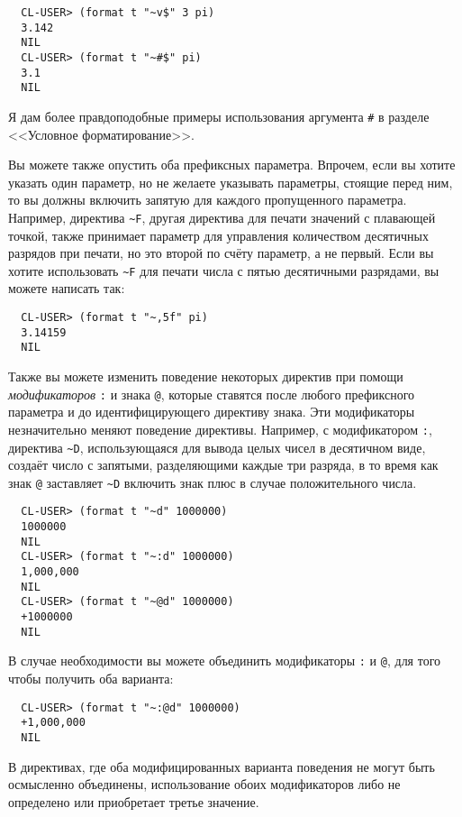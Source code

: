 \begin{verbatim}
  CL-USER> (format t "~v$" 3 pi)
  3.142
  NIL
  CL-USER> (format t "~#$" pi)
  3.1
  NIL
\end{verbatim}

Я дам более правдоподобные примеры использования аргумента \lstinline!#! в
разделе <<Условное форматирование>>.

Вы можете также опустить оба префиксных параметра. Впрочем, если вы хотите указать один
параметр, но не желаете указывать параметры, стоящие перед ним, то вы должны включить
запятую для каждого пропущенного параметра. Например, директива \lstinline!~F!, другая
директива для печати значений с плавающей точкой, также принимает параметр для управления
количеством десятичных разрядов при печати, но это второй по счёту параметр, а не
первый. Если вы хотите использовать \lstinline!~F! для печати числа с пятью десятичными
разрядами, вы можете написать так:

\begin{verbatim}
  CL-USER> (format t "~,5f" pi)
  3.14159
  NIL
\end{verbatim}

Также вы можете изменить поведение некоторых директив при помощи \textit{модификаторов}
\lstinline!:! и знака \lstinline!@!, которые ставятся после любого префиксного параметра и
до идентифицирующего директиву знака. Эти модификаторы незначительно меняют поведение
директивы. Например, с модификатором \lstinline!:!, директива \lstinline!~D!,
использующаяся для вывода целых чисел в десятичном виде, создаёт число с запятыми,
разделяющими каждые три разряда, в то время как знак \lstinline!@! заставляет
\lstinline!~D!  включить знак плюс в случае положительного числа.

\begin{verbatim}
  CL-USER> (format t "~d" 1000000)
  1000000
  NIL
  CL-USER> (format t "~:d" 1000000)
  1,000,000
  NIL
  CL-USER> (format t "~@d" 1000000)
  +1000000
  NIL
\end{verbatim}

В случае необходимости вы можете объединить модификаторы \lstinline!:! и \lstinline!@!,
для того чтобы получить оба варианта:

\begin{verbatim}
  CL-USER> (format t "~:@d" 1000000)
  +1,000,000
  NIL
\end{verbatim}

В директивах, где оба модифицированных варианта поведения не могут быть осмысленно
объединены, использование обоих модификаторов либо не определено или приобретает третье
значение.

